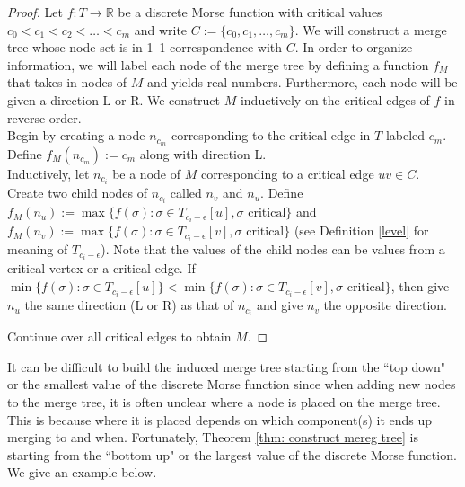\documentclass{article}
\theoremstyle{definition}
\newcommand{\ep}    {\epsilon}
\newcommand{\RR}    {\mathbb{R}}
\begin{document}
\begin{proof}
Let $f\colon T \to \RR$ be a discrete Morse function with critical values $c_0<c_1<c_2<\ldots < c_m$ and write $C:=\{c_0, c_1, \ldots, c_m\}$. We will construct a merge tree whose node set is in 1--1 correspondence with $C$. In order to organize information, we will label each node of the merge tree by defining a function $f_M$ that takes in nodes of $M$ and yields real numbers. Furthermore, each node will be given a direction L or R. We construct $M$ inductively on the critical edges of $f$ in reverse order.\\

Begin by creating a node $n_{c_m}$ corresponding to the critical edge in $T$ labeled $c_m$.  Define $f_M(n_{c_m}):= c_m$ along with direction L. \\


Inductively, let $n_{c_i}$ be a node of $M$ corresponding to a critical edge $uv\in C$.   Create two child nodes of $n_{c_i}$  called $n_v$ and $n_u$.  Define $f_M(n_u):=\max\{f(\sigma) \colon \sigma \in T_{c_{i}-\ep}[u], \sigma \text{ critical}\}$ and $f_M(n_v):=\max\{f(\sigma) \colon \sigma \in T_{c_{i}-\ep}[v], \sigma \text{ critical}\}$ (see Definition \ref{level} for meaning of $T_{c_i-\ep}$).  Note that the values of the child nodes can be values from a critical vertex or a critical edge.  If $\min\{f(\sigma) \colon \sigma \in T_{c_{i}-\ep}[u]\} < \min\{f(\sigma) \colon \sigma \in T_{c_{i}-\ep}[v], \sigma \text{ critical}\}$, then give $n_u$ the same direction (L or R) as that of $n_{c_i}$ and give $n_v$ the opposite direction.

Continue over all critical edges to obtain $M$.
\end{proof}



It can be difficult to build the induced merge tree starting from the ``top down" or the smallest value of the discrete Morse function since when adding new nodes to the merge tree, it is often unclear where a node is placed on the merge tree.  This is because where it is placed depends on which component(s) it ends up merging to and when.  Fortunately, Theorem \ref{thm: construct mereg tree} is  starting from the ``bottom up" or the largest value of the discrete Morse function.  We give an example below.
\end{document}

